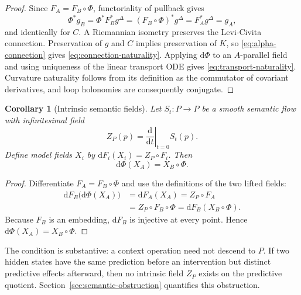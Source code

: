 \documentclass[11pt]{article}
\newtheorem{corollary}[theorem]{Corollary}
\theoremstyle{definition}
\theoremstyle{remark}
\newcommand{\dd}{\mathrm{d}}
\begin{document}
\begin{proof}
Since $F_A=F_B\circ\Phi$, functoriality of pullback gives
\begin{equation}
    \Phi^*g_B=\Phi^*F_B^*g^\Delta=(F_B\circ\Phi)^*g^\Delta=F_A^*g^\Delta=g_A,
\end{equation}
and identically for $C$. A Riemannian isometry preserves the Levi-Civita connection. Preservation of $g$ and $C$ implies preservation of $K$, so \eqref{eq:alpha-connection} gives \eqref{eq:connection-naturality}. Applying $\dd\Phi$ to an $A$-parallel field and using uniqueness of the linear transport ODE gives \eqref{eq:transport-naturality}. Curvature naturality follows from its definition as the commutator of covariant derivatives, and loop holonomies are consequently conjugate.
\end{proof}

\begin{corollary}[Intrinsic semantic fields]\label{cor:intrinsic-field}
Let $S_t:P\to P$ be a smooth semantic flow with infinitesimal field
\begin{equation}
    Z_P(p)=\left.\frac{\dd}{\dd t}\right|_{t=0}S_t(p).
\end{equation}
Define model fields $X_i$ by $\dd F_i(X_i)=Z_P\circ F_i$. Then
\begin{equation}
    \dd\Phi(X_A)=X_B\circ\Phi.
\end{equation}
\end{corollary}

\begin{proof}
Differentiate $F_A=F_B\circ\Phi$ and use the definitions of the two lifted fields:
\begin{equation}
\begin{split}
    \dd F_B\bigl(\dd\Phi(X_A)\bigr)
    &=\dd F_A(X_A)
      =Z_P\circ F_A\\
    &=Z_P\circ F_B\circ\Phi
      =\dd F_B(X_B\circ\Phi).
\end{split}
\end{equation}
Because $F_B$ is an embedding, $\dd F_B$ is injective at every point. Hence $\dd\Phi(X_A)=X_B\circ\Phi$.
\end{proof}

The condition is substantive: a context operation need not descend to $P$. If two hidden states have the same prediction before an intervention but distinct predictive effects afterward, then no intrinsic field $Z_P$ exists on the predictive quotient. Section~\ref{sec:semantic-obstruction} quantifies this obstruction.
\end{document}
